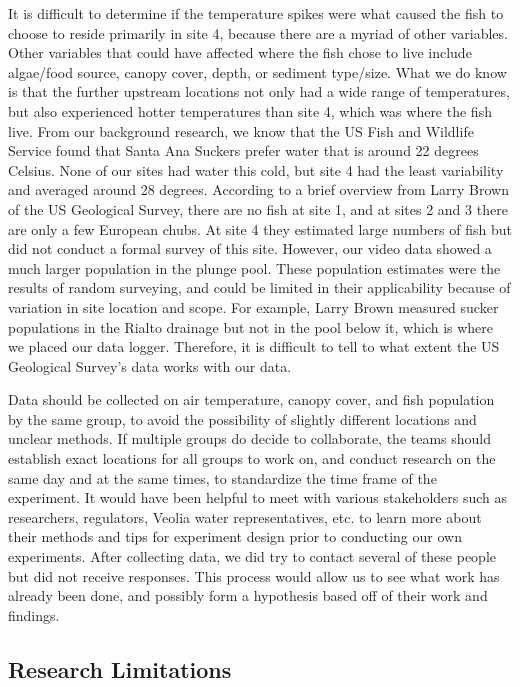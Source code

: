 \documentclass{article}\usepackage[]{graphicx}\usepackage[]{color}
\begin{document}
It is difficult to determine if the temperature spikes were what caused the fish to choose to reside primarily in site 4, because there are a myriad of other variables. Other variables that could have affected where the fish chose to live include algae/food source, canopy cover, depth, or sediment type/size. What we do know is that the further upstream locations not only had a wide range of temperatures, but also experienced hotter temperatures than site 4, which was where the fish live. From our background research, we know that the US Fish and Wildlife Service found that Santa Ana Suckers prefer water that is around 22 degrees Celsius. None of our sites had water this cold, but site 4 had the least variability and averaged around 28 degrees. According to a brief overview from Larry Brown of the US Geological Survey, there are no fish at site 1, and at sites 2 and 3 there are only a few European chubs. At site 4 they estimated large numbers of fish but did not conduct a formal survey of this site. However, our video data showed a much larger population in the plunge pool. These population estimates were the results of random surveying, and could be limited in their applicability because of variation in site location and scope. For example, Larry Brown measured sucker populations in the Rialto drainage but not in the pool below it, which is where we placed our data logger. Therefore, it is difficult to tell to what extent the US Geological Survey’s data works with our data. 

Data should be collected on air temperature, canopy cover, and fish population by the same group, to avoid the possibility of slightly different locations and unclear methods. If multiple groups do decide to collaborate, the teams should establish exact locations for all groups to work on, and conduct research on the same day and at the same times, to standardize the time frame of the experiment. It would have been helpful to meet with various stakeholders such as researchers, regulators, Veolia water representatives, etc. to learn more about their methods and tips for experiment design prior to conducting our own experiments. After collecting data, we did try to contact several of these people but did not receive responses. This process would allow us to see what work has already been done, and possibly form a hypothesis based off of their work and findings.

\subsection{Research Limitations}
\end{document}
